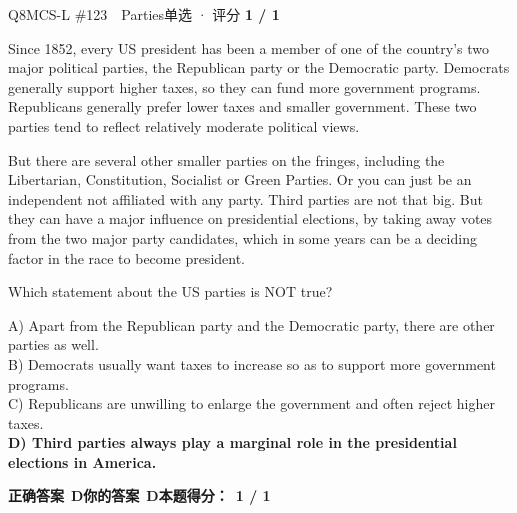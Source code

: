 \begin{qblock}{Q8\quad MCS-L \#123\ \ Parties}{单选 · 评分 \textcolor{cAccent}{\bfseries 1 / 1}}
\begin{promptbox}
Since 1852, every US president has been a member of one of the country's two major political parties, the Republican party or the Democratic party. Democrats generally support higher taxes, so they can fund more government programs. Republicans generally prefer lower taxes and smaller government. These two parties tend to reflect relatively moderate political views.

But there are several other smaller parties on the fringes, including the Libertarian, Constitution, Socialist or Green Parties. Or you can just be an independent not affiliated with any party. Third parties are not that big. But they can have a major influence on presidential elections, by taking away votes from the two major party candidates, which in some years can be a deciding factor in the race to become president.
\end{promptbox}
\begin{notebox}Which statement about the US parties is NOT true?\end{notebox}
{\small
A) Apart from the Republican party and the Democratic party, there are other parties as well.\\
B) Democrats usually want taxes to increase so as to support more government programs.\\
C) Republicans are unwilling to enlarge the government and often reject higher taxes.\\
{\color{cFix}\textbf{D) Third parties always play a marginal role in the presidential elections in America.}}}
\par\smallskip
\textbf{正确答案}\ \textcolor{cFix}{\bfseries D}\qquad\textbf{你的答案}\ \textcolor{cFix}{\bfseries D}\qquad\textbf{本题得分：}\ {\color{cAccent}\bfseries 1 / 1}
\end{qblock}

